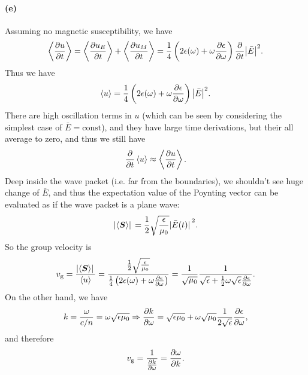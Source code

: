 \documentclass[hyperref, a4paper]{article}
\newcommand*{\const}{\mathrm{const}}
\begin{document}
\paragraph{(e)} Assuming no magnetic susceptibility,
we have 
\begin{equation}
    \expval{\pdv{u}{t}} = \expval{\pdv{u_E}{t}} + \expval{\pdv{u_M}{t}}
    = \frac{1}{4} \left(
        2 \epsilon(\omega) + \omega \pdv{\epsilon}{\omega}
    \right) \pdv{t} \abs{\bar{E}}^2.
\end{equation}
Thus we have 
\begin{equation}
    \expval{u} = \frac{1}{4} \left(
        2 \epsilon(\omega) + \omega \pdv{\epsilon}{\omega}
    \right) \abs{\bar{E}}^2.
\end{equation}
There are high oscillation terms in $u$ 
(which can be seen by considering the simplest case of $\bar{E} = \const$),
and they have large time derivations, 
but their all average to zero,
and thus we still have 
\begin{equation}
    \pdv{t}\expval{u} \approx \expval{\pdv{u}{t}}.
\end{equation}
Deep inside the wave packet (i.e. far from the boundaries), 
we shouldn't see huge change of $\bar{E}$,
and thus the expectation value of the Poynting vector 
can be evaluated as if the wave packet is a plane wave:
\begin{equation}
    \abs*{\expval{\vb*{S}}}  = \frac{1}{2} \sqrt{\frac{\epsilon}{\mu_0}} \abs*{\bar{E}(t)}^2.
\end{equation}
So the group velocity is 
\begin{equation}
    v_{\text{g}} = \frac{\abs*{\expval{\vb*{S}}}}{\expval{u}}
    = \frac{
        \frac{1}{2} \sqrt{\frac{\epsilon}{\mu_0}}
    }{
        \frac{1}{4} \left(
        2 \epsilon(\omega) + \omega \pdv{\epsilon}{\omega}
        \right)
    }
    = \frac{1}{\sqrt{\mu_0}} \frac{1}{
        \sqrt{\epsilon} + \frac{1}{2} \omega \sqrt{\epsilon} \pdv{\epsilon}{\omega}
    }.
\end{equation}
On the other hand, we have 
\begin{equation}
    k = \frac{\omega}{c / n} = \omega \sqrt{\epsilon \mu_0} \Rightarrow
    \pdv{k}{\omega} = \sqrt{\epsilon \mu_0} + \omega \sqrt{\mu_0} \frac{1}{2 \sqrt{\epsilon}} \pdv{\epsilon}{\omega}, 
\end{equation}
and therefore 
\begin{equation}
    v_{\text{g}} = \frac{1}{\pdv{k}{\omega}} = \pdv{\omega}{k}.
\end{equation}
\end{document}
